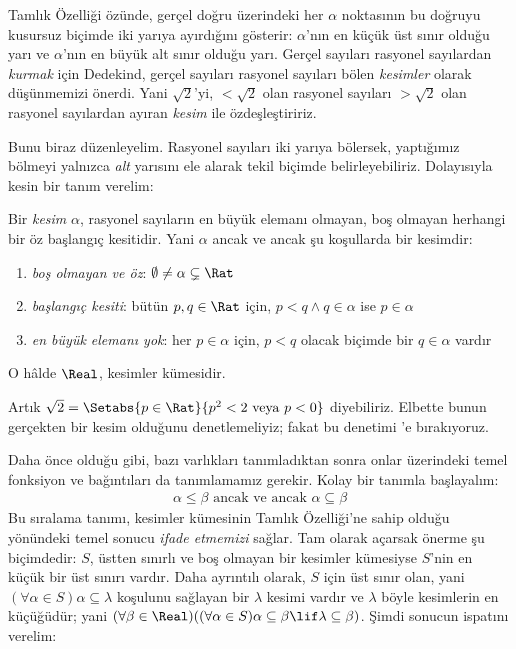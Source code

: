 \documentclass[../../../include/open-logic-section]{subfiles}
\begin{document}

Tamlık Özelliği özünde, gerçel doğru üzerindeki her $\alpha$ noktasının bu
doğruyu kusursuz biçimde iki yarıya ayırdığını gösterir: $\alpha$'nın en küçük
üst sınır olduğu yarı ve $\alpha$'nın en büyük alt sınır olduğu yarı. Gerçel
sayıları rasyonel sayılardan \emph{kurmak} için Dedekind, gerçel sayıları
rasyonel sayıları bölen \emph{kesimler} olarak düşünmemizi önerdi. Yani
$\sqrt{2}$'yi, $< \sqrt{2}$ olan rasyonel sayıları $> \sqrt{2}$ olan
rasyonel sayılardan ayıran \emph{kesim} ile özdeşleştiririz.

Bunu biraz düzenleyelim. Rasyonel sayıları iki yarıya bölersek, yaptığımız
bölmeyi yalnızca \emph{alt} yarısını ele alarak tekil biçimde belirleyebiliriz.
Dolayısıyla kesin bir tanım verelim:

\begin{defn}[Kesim]
Bir \emph{kesim} $\alpha$, rasyonel sayıların en büyük elemanı olmayan, boş
olmayan herhangi bir öz başlangıç kesitidir. Yani $\alpha$ ancak ve ancak şu
koşullarda bir kesimdir:
\begin{enumerate}
	\item \emph{boş olmayan ve öz}: $\emptyset \neq \alpha \subsetneq \Rat$
	\item \emph{başlangıç kesiti}: bütün $p,q \in \Rat$ için,
	$p < q \land q \in \alpha$ ise $p \in \alpha$
	\item \emph{en büyük elemanı yok}: her $p \in \alpha$ için,
	$p < q$ olacak biçimde bir $q \in \alpha$ vardır
\end{enumerate}
O hâlde $\Real$, kesimler kümesidir.
\end{defn}

Artık $\sqrt{2} = \Setabs{p \in \Rat}{p^2 < 2\text{ veya }p < 0}$
diyebiliriz. Elbette bunun gerçekten bir kesim olduğunu denetlemeliyiz; fakat
bu denetimi 'e bırakıyoruz.

Daha önce olduğu gibi, bazı varlıkları tanımladıktan sonra onlar üzerindeki
temel fonksiyon ve bağıntıları da tanımlamamız gerekir. Kolay bir tanımla
başlayalım:
\begin{align*}
	\alpha \leq \beta \text{ ancak ve ancak }\alpha \subseteq \beta
\end{align*}
Bu sıralama tanımı, kesimler kümesinin Tamlık Özelliği'ne sahip olduğu
yönündeki temel sonucu \emph{ifade etmemizi} sağlar. Tam olarak açarsak önerme
şu biçimdedir: $S$, üstten sınırlı ve boş olmayan bir kesimler kümesiyse
$S$'nin en küçük bir üst sınırı vardır. Daha ayrıntılı olarak, $S$ için üst
sınır olan, yani $(\forall \alpha \in S)\alpha \subseteq \lambda$ koşulunu
sağlayan bir $\lambda$ kesimi vardır ve $\lambda$ böyle kesimlerin en
küçüğüdür; yani
$(\forall \beta \in \Real)((\forall \alpha \in S)\alpha \subseteq \beta
\lif \lambda \subseteq \beta)$. Şimdi sonucun ispatını verelim:
\end{document}
